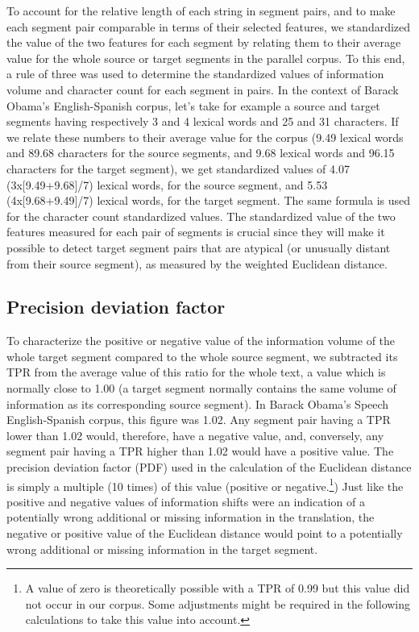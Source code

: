 \documentclass[output=paper]{langsci/langscibook}
\begin{document}
To account for the relative length of each string in segment pairs, and to make each segment pair comparable in terms of their selected features, we standardized the value of the two features for each segment by relating them to their average value for the whole source or target segments in the parallel corpus. To this end, a rule of three was used to determine the standardized values of information volume and character count for each segment in pairs. In the context of Barack Obama’s English-Spanish corpus, let’s take for example a source and target segments having respectively 3 and 4 lexical words and 25 and 31 characters. If we relate these numbers to their average value for the corpus (9.49 lexical words and 89.68 characters for the source segments, and 9.68 lexical words and 96.15 characters for the target segment), we get standardized values of 4.07 (3x[9.49+9.68]/7) lexical words, for the source segment, and 5.53 (4x[9.68+9.49]/7) lexical words, for the target segment. The same formula is used for the character count standardized values. The standardized value of the two features measured for each pair of segments is crucial since they will make it possible to detect target segment pairs that are atypical (or unusually distant from their source segment), as measured by the weighted Euclidean distance.

\subsection{Precision deviation factor}

To characterize the positive or negative value of the information volume of the whole target segment compared to the whole source segment, we subtracted its TPR from the average value of this ratio for the whole text, a value which is normally close to 1.00 (a target segment normally contains the same volume of information as its corresponding source segment). In Barack Obama’s Speech English-Spanish corpus, this figure was 1.02. Any segment pair having a TPR lower than 1.02 would, therefore, have a negative value, and, conversely, any segment pair having a TPR higher than 1.02 would have a positive value. The precision deviation factor (PDF) used in the calculation of the Euclidean distance is simply a multiple (10 times) of this value (positive or negative.\footnote{A value of zero is theoretically possible with a TPR of 0.99 but this value did not occur in our corpus. Some adjustments might be required in the following calculations to take this value into account.}) Just like the positive and negative values of information shifts were an indication of a potentially wrong additional or missing information in the translation, the negative or positive value of the Euclidean distance would point to a potentially wrong additional or missing information in the target segment.
\end{document}
